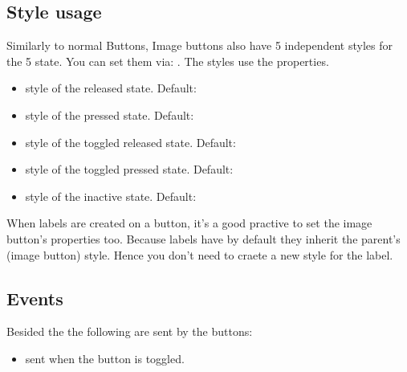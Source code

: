 \documentclass[letterpaper,10pt,english]{sphinxmanual}
\begin{document}
\subsection{Style usage}
\label{\detokenize{object-types/imgbtn:style-usage}}
Similarly to normal Buttons, Image buttons also have 5 independent styles for the 5 state. You can set them via: . The styles use the  properties.
\begin{itemize}
\item {} 
 style of the released state. Default: 

\item {} 
 style of the pressed state. Default: 

\item {} 
 style of the toggled released state. Default: 

\item {} 
 style of the toggled pressed state. Default: 

\item {} 
 style of the inactive state. Default: 

\end{itemize}

When labels are created on a button, it’s a good practive to set the image button’s  properties too. Because labels have  by default they inherit the parent’s (image button) style.
Hence you don’t need to craete a new style for the label.


\subsection{Events}
\label{\detokenize{object-types/imgbtn:events}}
Besided the  the following  are sent by the buttons:
\begin{itemize}
\item {} 
 sent when the button is toggled.

\end{itemize}
\end{document}
